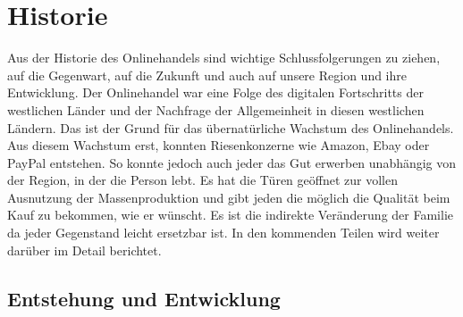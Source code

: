 \documentclass[a4paper, 12pt]{scrartcl}
\begin{document}
    
    
    \section{Historie}
    
    
    
    Aus der Historie des Onlinehandels sind wichtige Schlussfolgerungen zu ziehen, auf die Gegenwart, auf die Zukunft und auch auf unsere Region und ihre Entwicklung. Der Onlinehandel war eine Folge des digitalen Fortschritts der westlichen Länder und der Nachfrage der Allgemeinheit in diesen westlichen Ländern. Das ist der Grund für das übernatürliche Wachstum des Onlinehandels. Aus diesem Wachstum erst, konnten Riesenkonzerne wie Amazon, Ebay oder PayPal entstehen. So konnte jedoch auch jeder das Gut erwerben unabhängig von der Region, in der die Person lebt. Es hat die Türen geöffnet zur vollen Ausnutzung der Massenproduktion und gibt jeden die möglich die Qualität beim Kauf zu bekommen, wie er wünscht. Es ist die indirekte Veränderung der Familie da jeder Gegenstand leicht ersetzbar ist. In den kommenden Teilen wird weiter darüber im Detail berichtet.

    
    
    
        \subsection{Entstehung und Entwicklung}
        
\end{document}
